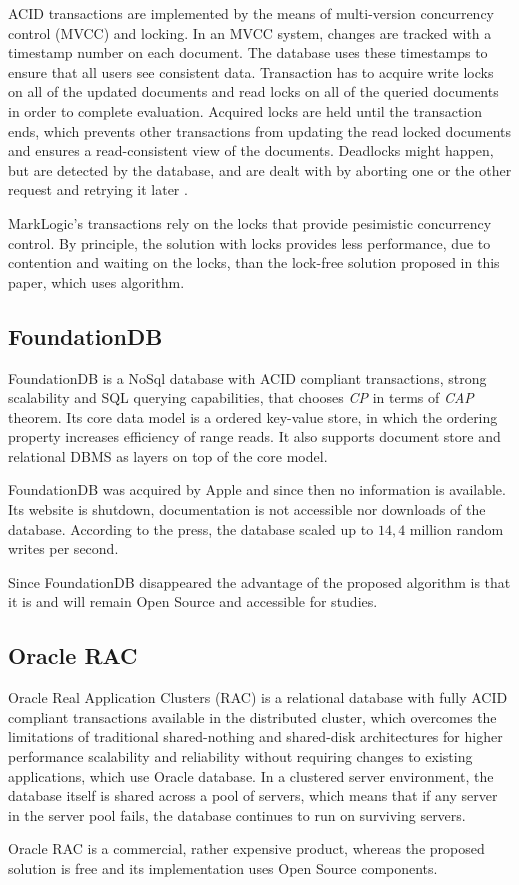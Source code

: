 ACID transactions are implemented by the means of multi-version concurrency control (MVCC) and locking. In an MVCC system, changes are tracked with a timestamp number on each document. 
The database uses these timestamps to ensure that all users see consistent data. 
Transaction has to acquire write locks on all of the updated documents and read locks on all of the queried documents in order to complete evaluation. Acquired locks are held until the transaction ends, which prevents other transactions from updating the read locked documents and ensures a read-consistent view of the documents. 
Deadlocks might happen, but are detected by the database, and are dealt with by aborting one or the other request and retrying it later \cite{markLogicUnderstandingTransactions}.

MarkLogic's transactions rely on the locks that provide pesimistic concurrency control.
By principle, the solution with locks provides less performance, due to contention and waiting on the locks, than the lock-free solution proposed in this paper, which uses \paxos algorithm.


\subsection{FoundationDB}
FoundationDB is a NoSql database with ACID compliant transactions, strong scalability and SQL querying capabilities, that chooses \emph{CP} in terms of \emph{CAP} theorem.
Its core data model is a ordered key-value store, in which the ordering property increases efficiency of range reads. It also supports document store and relational DBMS as layers on top of the core model. 

FoundationDB was acquired by Apple \cite{foundationDbAcquired} and since then no information is available. Its website is shutdown, documentation is not accessible nor downloads of the database. According to the press, the database scaled up to $14,4$ million random writes per second.

Since FoundationDB disappeared the advantage of the proposed algorithm is that it is and will remain Open Source and accessible for studies.

\subsection{Oracle RAC}
Oracle Real Application Clusters (RAC) is a relational database with fully ACID compliant transactions available in the distributed cluster, which overcomes the limitations of traditional shared-nothing and
shared-disk architectures for higher performance scalability and
reliability without requiring changes to existing applications, which use Oracle database.
In a clustered server environment, the database
itself is shared across a pool of servers, which means that if any server in the server pool fails,
the database continues to run on surviving servers.

 Oracle RAC is a commercial, rather expensive product, whereas the proposed solution is free and its implementation uses Open Source components.

